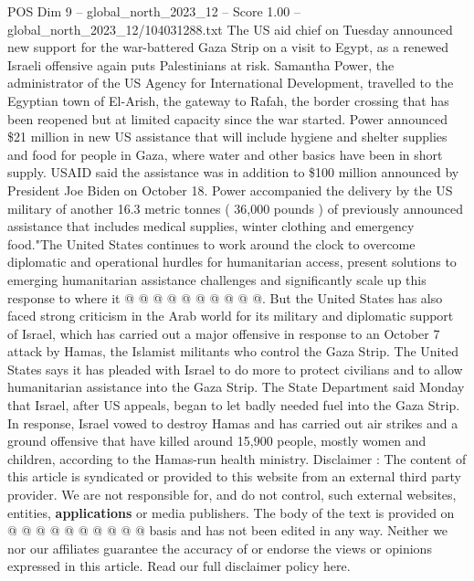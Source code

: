 \begin{textsample}{POS Dim 9 – global\_north\_2023\_12 – Score 1.00 – global\_north\_2023\_12/104031288.txt}  \label{ex:f9_pos_371}
The US aid chief on Tuesday announced new support for the war-battered Gaza Strip on a visit to Egypt, as a renewed Israeli offensive again puts Palestinians at risk.
Samantha Power, the administrator of the US Agency for International Development, travelled to the Egyptian town of El-Arish, the gateway to Rafah, the border crossing that has been reopened but at limited capacity since the war started.
Power announced \$21 million in new US assistance that will include hygiene and shelter supplies and food for people in Gaza, where water and other basics have been in short supply.
USAID said the assistance was in addition to \$100 million announced by President Joe Biden on October 18.
Power accompanied the delivery by the US military of another 16.3 metric tonnes ( 36,000 pounds ) of previously announced assistance that includes medical supplies, winter clothing and emergency food."The United States continues to work around the clock to overcome diplomatic and operational hurdles for humanitarian access, present solutions to emerging humanitarian assistance challenges and significantly scale up this response to where it @ @ @ @ @ @ @ @ @ @.
But the United States has also faced strong criticism in the Arab world for its military and diplomatic support of Israel, which has carried out a major offensive in response to an October 7 attack by Hamas, the Islamist militants who control the Gaza Strip.
The United States says it has pleaded with Israel to do more to protect civilians and to allow humanitarian assistance into the Gaza Strip.
The State Department said Monday that Israel, after US appeals, began to let badly needed fuel into the Gaza Strip.
In response, Israel vowed to destroy Hamas and has carried out air strikes and a ground offensive that have killed around 15,900 people, mostly women and children, according to the Hamas-run health ministry.
Disclaimer : The content of this article is syndicated or provided to this website from an external third party provider.
We are not responsible for, and do not control, such external websites, entities, \textbf{applications} or media publishers.
The body of the text is provided on @ @ @ @ @ @ @ @ @ @ basis and has not been edited in any way.
Neither we nor our affiliates guarantee the accuracy of or endorse the views or opinions expressed in this article.
Read our full disclaimer policy here.

\end{textsample}
